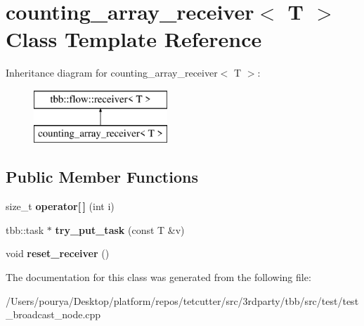 \hypertarget{classcounting__array__receiver}{}\section{counting\+\_\+array\+\_\+receiver$<$ T $>$ Class Template Reference}
\label{classcounting__array__receiver}
Inheritance diagram for counting\+\_\+array\+\_\+receiver$<$ T $>$\+:\begin{figure}[H]
\begin{center}
\leavevmode
\includegraphics[height=2.000000cm]{classcounting__array__receiver}
\end{center}
\end{figure}
\subsection*{Public Member Functions}
\begin{DoxyCompactItemize}
\item 
\hypertarget{classcounting__array__receiver_a0f310f9f47dc71dc80c7f6d8b0573433}{}size\+\_\+t {\bfseries operator\mbox{[}$\,$\mbox{]}} (int i)\label{classcounting__array__receiver_a0f310f9f47dc71dc80c7f6d8b0573433}

\item 
\hypertarget{classcounting__array__receiver_a20e547842c5ce6d9655c77aa739734de}{}tbb\+::task $\ast$ {\bfseries try\+\_\+put\+\_\+task} (const T \&v)\label{classcounting__array__receiver_a20e547842c5ce6d9655c77aa739734de}

\item 
\hypertarget{classcounting__array__receiver_a3f1300b7cc2237ef87b31ea418998283}{}void {\bfseries reset\+\_\+receiver} ()\label{classcounting__array__receiver_a3f1300b7cc2237ef87b31ea418998283}

\end{DoxyCompactItemize}


The documentation for this class was generated from the following file\+:\begin{DoxyCompactItemize}
\item 
/\+Users/pourya/\+Desktop/platform/repos/tetcutter/src/3rdparty/tbb/src/test/test\+\_\+broadcast\+\_\+node.\+cpp\end{DoxyCompactItemize}
